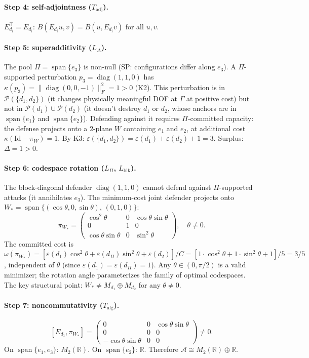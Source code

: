 \documentclass[11pt,a4paper]{article}
\theoremstyle{definition}
\newcommand{\eps}{\varepsilon}
\DeclareMathOperator{\spn}{span}
\DeclareMathOperator{\diag}{diag}
\begin{document}
\paragraph{Step 4: self-adjointness ($T_{\mathrm{adj}}$).}
$E_{d_i}^\top = E_{d_i}$: $B(E_{d_i} u, v) = B(u, E_{d_i} v)$ for all $u,v$.

\paragraph{Step 5: superadditivity ($L_\Delta$).}
The pool $\Pi = \spn\{e_3\}$ is non-null (SP: configurations differ along $e_3$).  A $\Pi$-supported perturbation $p_3 = \diag(1,1,0)$ has $\kappa(p_3) = \|\diag(0,0,-1)\|_F^2 = 1 > 0$ (K2).  This perturbation is in $\mathcal{P}(\{d_1,d_2\})$ (it changes physically meaningful DOF at $\Gamma$ at positive cost) but not in $\mathcal{P}(d_1) \cup \mathcal{P}(d_2)$ (it doesn't destroy $d_1$ or $d_2$, whose anchors are in $\spn\{e_1\}$ and $\spn\{e_2\}$).  Defending against it requires $\Pi$-committed capacity: the defense projects onto a 2-plane $W$ containing $e_1$ and $e_2$, at additional cost $\kappa(\mathrm{Id} - \pi_W) = 1$.  By K3: $\eps(\{d_1,d_2\}) = \eps(d_1) + \eps(d_2) + 1 = 3$.  Surplus: $\Delta = 1 > 0$.

\paragraph{Step 6: codespace rotation ($L_\Pi$, $L_{\mathrm{blk}}$).}
The block-diagonal defender $\diag(1,1,0)$ cannot defend against $\Pi$-supported attacks (it annihilates $e_3$).  The minimum-cost joint defender projects onto $W_* = \spn\{(\cos\theta, 0, \sin\theta),\, (0,1,0)\}$:
\[
\pi_{W_*} = \begin{pmatrix} \cos^2\!\theta & 0 & \cos\theta\sin\theta \\ 0 & 1 & 0 \\ \cos\theta\sin\theta & 0 & \sin^2\!\theta \end{pmatrix}, \quad \theta \ne 0.
\]
The committed cost is $\omega(\pi_{W_*}) = [\eps(d_1)\cos^2\!\theta + \eps(d_\Pi)\sin^2\!\theta + \eps(d_2)]/C = [1\cdot\cos^2\!\theta + 1\cdot\sin^2\!\theta + 1]/5 = 3/5$, independent of $\theta$ (since $\eps(d_1) = \eps(d_\Pi) = 1$).  Any $\theta \in (0, \pi/2)$ is a valid minimizer; the rotation angle parameterizes the family of optimal codespaces.  The key structural point: $W_* \ne M_{d_1} \oplus M_{d_2}$ for any $\theta \ne 0$.

\paragraph{Step 7: noncommutativity ($T_{\mathrm{alg}}$).}
\[
[E_{d_1}, \pi_{W_*}] = \begin{pmatrix} 0 & 0 & \cos\theta\sin\theta \\ 0 & 0 & 0 \\ -\cos\theta\sin\theta & 0 & 0 \end{pmatrix} \ne 0.
\]
On $\spn\{e_1, e_3\}$: $M_2(\mathbb{R})$.  On $\spn\{e_2\}$: $\mathbb{R}$.  Therefore $\mathcal{A} \cong M_2(\mathbb{R}) \oplus \mathbb{R}$.
\end{document}
